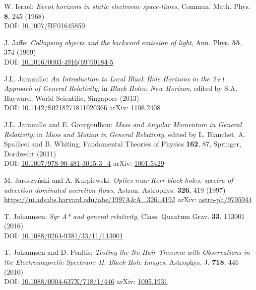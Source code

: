 \begin{thebibliography}{123}
W. Israel: {\em Event horizons in static electrovac space-times},
Commun. Math. Phys. {\bf 8}, 245 (1968)\\
DOI: \href{https://doi.org/10.1007/BF01645859}{10.1007/BF01645859}

J. Jaffe:
{\em Collapsing objects and the backward emission of light},
Ann. Phys. {\bf 55}, 374 (1969)\\
DOI: \href{https://doi.org/10.1016/0003-4916(69)90184-5}{10.1016/0003-4916(69)90184-5}

J.L. Jaramillo: {\em An Introduction to Local Black Hole Horizons in the 3+1
Approach of General Relativity}, in {\em Black Holes: New Horizon}, edited
by S.A. Hayward, World Scientific, Singapore (2013)\\
DOI: \href{https://doi.org/10.1142/S0218271811020366}{10.1142/S0218271811020366}\hfill
arXiv: \href{https://arxiv.org/abs/1108.2408}{1108.2408}

J.L. Jaramillo and E. Gourgoulhon:
{\em Mass and Angular Momentum in General Relativity},
in \emph{Mass and Motion in General Relativity}, edited by L. Blanchet, A. Spallicci and B. Whiting, Fundamental Theories of Physics {\bf 162}, 87,
Springer, Dordrecht (2011) \\
DOI: \href{https://doi.org/10.1007/978-90-481-3015-3_4}{10.1007/978-90-481-3015-3\_4}\hfill
arXiv: \href{https://arxiv.org/abs/1001.5429}{1001.5429}

M. Jaroszy\'nski and A. Kurpiewski:
{\em Optics near Kerr black holes: spectra of advection dominated accretion flows},
Astron. Astrophys. {\bf 326}, 419 (1997)\\
\url{https://ui.adsabs.harvard.edu/abs/1997A&A...326..419J}\hfill
arXiv: \href{https://arxiv.org/abs/astro-ph/9705044}{astro-ph/9705044}

T. Johannsen:
{\em Sgr A* and general relativity},
Class. Quantum Grav.  {\bf 33}, 113001 (2016)\\
DOI: \href{https://doi.org/10.1088/0264-9381/33/11/113001}{10.1088/0264-9381/33/11/113001}

T. Johannsen and D. Psaltis:
{\em Testing the No-Hair Theorem with Observations in the Electromagnetic Spectrum: II. Black-Hole Images},
Astrophys. J. {\bf 718}, 446 (2010)\\
DOI: \href{https://doi.org/10.1088/0004-637X/718/1/446}{10.1088/0004-637X/718/1/446}\hfill
arXiv: \href{https://arxiv.org/abs/1005.1931}{1005.1931}


\end{thebibliography}

